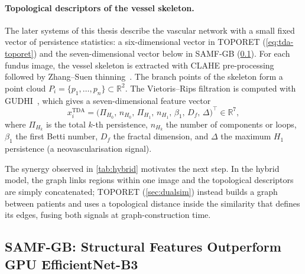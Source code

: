 \paragraph{Topological descriptors of the vessel skeleton.}
The later systems of this thesis describe the vascular network with a small fixed vector
of persistence statistics: a six-dimensional vector in TOPORET (\cref{eq:tda-toporet})
and the seven-dimensional vector below in SAMF-GB (\cref{sec:samfgb}). For each fundus image, the vessel skeleton is extracted with CLAHE
pre-processing~\cite{zuiderveld1994clahe} followed by Zhang--Suen
thinning~\cite{zhang1984thinning}. The branch points of the skeleton form a point cloud
$P_i=\{p_1,\ldots,p_n\}\subset\mathbb{R}^2$. The Vietoris--Rips filtration is computed
with GUDHI~\cite{maria2014gudhi}, which gives a seven-dimensional feature vector
\begin{equation}
x_i^{\mathrm{TDA}} = \bigl(\Pi_{H_0},\, n_{H_0},\, \Pi_{H_1},\, n_{H_1},\, \beta_1,\,
D_f,\, \Delta\bigr)^\top \in \mathbb{R}^7 ,
\label{eq:tda}
\end{equation}
where $\Pi_{H_k}$ is the total $k$-th persistence, $n_{H_k}$ the number of components
or loops, $\beta_1$ the first Betti number, $D_f$ the fractal dimension, and $\Delta$ the
maximum $H_1$ persistence (a neovascularisation signal).

The synergy observed in \cref{tab:hybrid} motivates the next step. In the hybrid model,
the graph links regions within one image and the topological descriptors are simply
concatenated; TOPORET (\cref{sec:dualsim}) instead builds a graph between patients and uses
a topological distance inside the similarity that defines its edges, fusing both signals at
graph-construction time.

\subsection{SAMF-GB: Structural Features Outperform GPU EfficientNet-B3}
\label{sec:samfgb}


